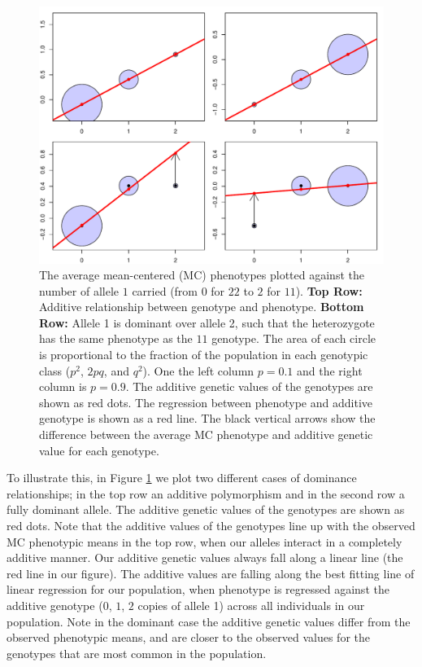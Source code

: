 \begin{figure}
\begin{center}
\includegraphics[width=\textwidth]{figures/additive_effect.pdf}
\end{center}
\caption{The average mean-centered (MC) phenotypes plotted against the
  number of allele $1$ carried (from $0$ for $22$ to $2$ for $11$). 
{\bf Top Row:} Additive relationship between genotype and phenotype. 
{\bf Bottom Row:} Allele 1 is dominant over allele 2, such that the
heterozygote has the same phenotype as the $11$ genotype. 
The area of each circle is proportional to the fraction of
the population in each genotypic class ($p^2$, $2pq$, and $q^2$). 
One the left column $p=0.1$ and the right column is $p=0.9$.
The additive genetic values of the genotypes are shown as
  red dots. The regression between phenotype and additive genotype is
  shown as a red line. The black vertical arrows show the difference
between the average MC phenotype and additive genetic value for each genotype. } \label{fig:add_dom}
\end{figure}


To illustrate this, in Figure \ref{fig:add_dom} we plot two different cases of dominance
relationships; in the top row an additive polymorphism and in the second
row a fully dominant allele. The additive genetic values of the genotypes are shown as red dots. Note that the additive values of the genotypes line up with
the observed MC phenotypic means in the top row, when our alleles interact in a
completely additive manner. Our additive genetic values always fall along a
linear line (the red line in our figure). The additive values are falling along the best
fitting line of linear regression for our population, when phenotype is
regressed against the additive genotype ($0$, $1$, $2$ copies of allele 1)
across all individuals in our population. Note in the dominant case the
additive genetic values differ from the observed phenotypic means, and are
closer to the observed values for the genotypes that are most common in the
population. \\

